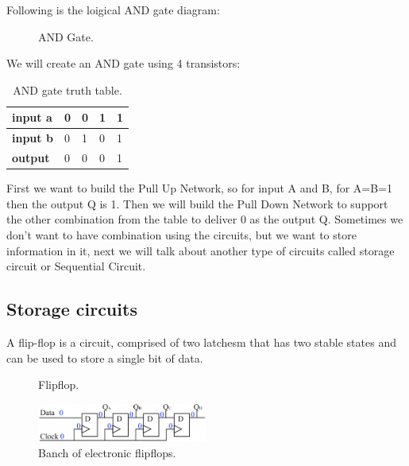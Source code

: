 Following is the loigical AND gate diagram:

\begin{figure}[!ht]
    \centering
    
    \caption{AND Gate.} \label{fig:and}
\end{figure}

We will create an AND gate using 4 transistors:

\begin{table}[!ht]
    \centering
    \caption{AND gate truth table.}
    \begin{tabular}{lllll}
        \toprule
        \textbf{input a} & 0 & 0 & 1 & 1 \\ \midrule \textbf{input b} & 0 & 1 &
        0 & 1 \\ \midrule \textbf{output}  & 0 & 0 & 0 & 1 \\ \bottomrule
    \end{tabular}
\end{table}

First we want to build the Pull Up Network, so for input A and B, for A=B=1 then
the output Q is 1. Then we will build the Pull Down Network to support the other
combination from the table to deliver 0 as the output Q. Sometimes we don't want
to have combination using the circuits, but we want to store information in it,
next we will talk about another type of circuits called storage circuit or
Sequential Circuit.

\subsection{Storage circuits}

A flip-flop is a circuit, comprised of two latchesm that has two stable states and can be used to store a single bit of data.
\begin{figure}[!ht]
    \centering
    
    \caption{Flipflop.} \label{fig:flipflop}
\end{figure}

\begin{figure}[!ht]
	\centering
	\includegraphics[width=0.5\textwidth]{images/banch_of_flipflops.png}
	\caption{Banch of electronic flipflops.} \label{fig:banch_of_flipflops}
\end{figure}

